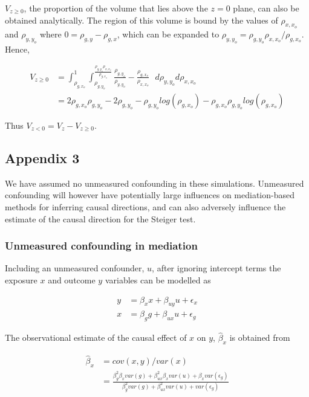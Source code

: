 \documentclass[]{article}
\begin{document}
\(V_{z \ge 0}\), the proportion of the volume that lies above the
\(z=0\) plane, can also be obtained analytically. The region of this
volume is bound by the values of \(\rho_{x,x_o}\) and \(\rho_{y,y_o}\)
where \(0 = \rho_{g,y} - \rho_{g,x}\), which can be expanded to
\(\rho_{y,y_o} = \rho_{g,y_o}\rho_{x,x_o} / \rho_{g,x_o}\). Hence,

\[
\begin{aligned}
V_{z \ge 0} & = \int^1_{\rho_{g,x_o}} \int^{\frac{\rho_{g,y_o}\rho_{x,x_o}}{\rho_{g,x_o}}}_{\rho_{g,y_o}} \frac{\rho_{g,y_o}}{\rho_{y,y_o}} - \frac{\rho_{g,x_o}}{\rho_{x,x_o}}\,\,\,\, d\rho_{y,y_o}d\rho_{x,x_o} \\
& = 2\rho_{g,x_o}\rho_{g,y_o} - 2\rho_{g,y_o} - \rho_{g,y_o}log(\rho_{g,x_o}) - \rho_{g,x_o}\rho_{g,y_o}log(\rho_{g,x_o})
\end{aligned}
\]

Thus \(V_{z < 0} = V_{z} - V_{z \geq 0}\).

\newpage

\subsection{Appendix 3}\label{appendix-3}

We have assumed no unmeasured confounding in these simulations.
Unmeasured confounding will however have potentially large influences on
mediation-based methods for inferring causal directions, and can also
adversely influence the estimate of the causal direction for the Steiger
test.

\subsubsection{Unmeasured confounding in
mediation}\label{unmeasured-confounding-in-mediation}

Including an unmeasured confounder, \(u\), after ignoring intercept
terms the exposure \(x\) and outcome \(y\) variables can be modelled as

\[
\begin{aligned}
y & = \beta_x x + \beta_{uy} u + \epsilon_x \\
x & = \beta_g g + \beta_{ux} u + \epsilon_g
\end{aligned}
\]

The observational estimate of the causal effect of \(x\) on \(y\),
\(\hat{\beta}_x\) is obtained from

\[
\begin{aligned}
\hat{\beta}_x & = cov(x, y) / var(x) \\
& = \frac{\beta_g^2 \beta_x var(g) + \beta_{ux}^2 \beta_x var(u) + \beta_x var(\epsilon_g)} {\beta_g^2 var(g) + \beta_{ux}^2 var(u) + var(\epsilon_g)}
\end{aligned}
\]
\end{document}
